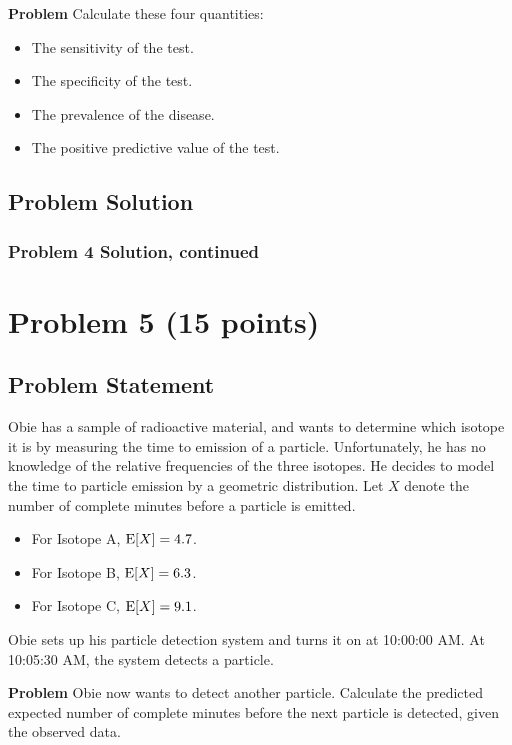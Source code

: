 \documentclass[12pt]{article}
\theoremstyle{definition}
\begin{document}
\bigskip
\noindent
{\bf Problem} Calculate these four quantities:
\begin{itemize}
	\item The sensitivity of the test.
	\item The specificity of the test.
	\item The prevalence of the disease.
	\item The positive predictive value of the test.
\end{itemize}

\subsection*{Problem Solution}


	
\newpage
\subsubsection*{Problem 4 Solution, continued}


\newpage
\section*{Problem 5 (15 points)}

\subsection*{Problem Statement}

Obie has a sample of radioactive material, and wants to determine which isotope it is by measuring the time to emission of a particle. Unfortunately, he has no knowledge of the relative frequencies of the three isotopes. He decides to model the time to particle emission by a geometric distribution. Let $X$ denote the number of complete minutes before a particle is emitted.
\begin{itemize}
	\item For Isotope A, $\hbox{E}[X] = 4.7$.
	\item For Isotope B, $\hbox{E}[X] = 6.3$.
	\item For Isotope C, $\hbox{E}[X] = 9.1$.
\end{itemize}
Obie sets up his particle detection system and turns it on at 10:00:00 AM. At 10:05:30 AM, the system detects a particle.

\bigskip
\noindent
{\bf Problem} Obie now wants to detect another particle. Calculate the predicted expected number of complete minutes before the next particle is detected, given the observed data.
\end{document}
